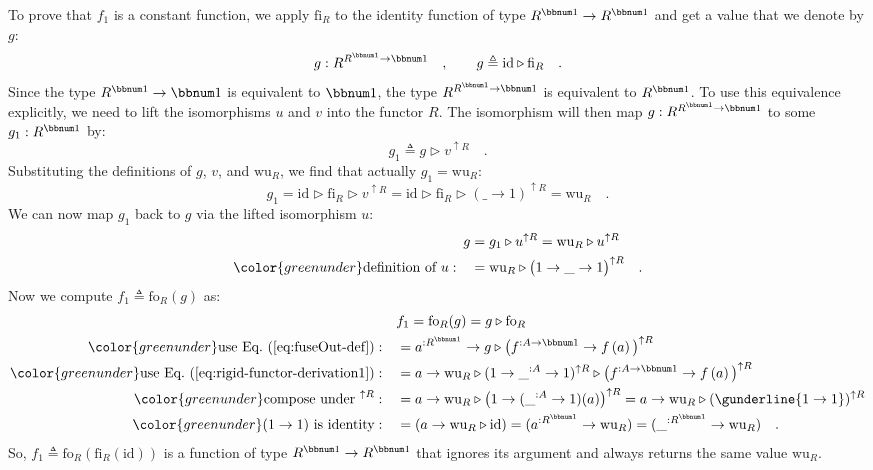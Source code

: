 To prove that $f_{1}$ is a constant function, we apply $\text{fi}_{R}$
to the identity function of type $R^{\bbnum 1}\rightarrow R^{\bbnum 1}$
and get a value that we denote by $g$:
\[
g:R^{R^{\bbnum 1}\rightarrow\bbnum 1}\quad,\quad\quad g\triangleq\text{id}\triangleright\text{fi}_{R}\quad.
\]
Since the type $R^{\bbnum 1}\rightarrow\bbnum 1$ is equivalent to
$\bbnum 1$, the type $R^{R^{\bbnum 1}\rightarrow\bbnum 1}$ is equivalent
to $R^{\bbnum 1}$. To use this equivalence explicitly, we need to
lift the isomorphisms $u$ and $v$ into the functor $R$. The isomorphism
will then map $g:R^{R^{\bbnum 1}\rightarrow\bbnum 1}$ to some $g_{1}:R^{\bbnum 1}$
by:
\[
g_{1}\triangleq g\triangleright v^{\uparrow R}\quad.
\]
Substituting the definitions of $g$, $v$, and $\text{wu}_{R}$,
we find that actually $g_{1}=\text{wu}_{R}$:
\[
g_{1}=\text{id}\triangleright\text{fi}_{R}\triangleright v^{\uparrow R}=\text{id}\triangleright\text{fi}_{R}\triangleright(\_\rightarrow1)^{\uparrow R}=\text{wu}_{R}\quad.
\]
We can now map $g_{1}$ back to $g$ via the lifted isomorphism $u$:
\begin{align}
g & =g_{1}\triangleright u^{\uparrow R}=\text{wu}_{R}\triangleright u^{\uparrow R}\nonumber \\
{\color{greenunder}\text{definition of }u:}\quad & =\text{wu}_{R}\triangleright\big(1\rightarrow\_\rightarrow1\big)^{\uparrow R}\quad.\label{eq:rigid-functor-derivation1}
\end{align}
Now we compute $f_{1}\triangleq\text{fo}_{R}(g)$ as:
\begin{align*}
 & f_{1}=\text{fo}_{R}(g)=g\triangleright\text{fo}_{R}\\
{\color{greenunder}\text{use Eq.~(\ref{eq:fuseOut-def})}:}\quad & =a^{:R^{\bbnum 1}}\rightarrow g\triangleright\big(f^{:A\rightarrow\bbnum 1}\rightarrow f\left(a\right)\big)^{\uparrow R}\\
{\color{greenunder}\text{use Eq.~(\ref{eq:rigid-functor-derivation1})}:}\quad & =a\rightarrow\text{wu}_{R}\triangleright(1\rightarrow\_^{:A}\rightarrow1)^{\uparrow R}\triangleright\big(f^{:A\rightarrow\bbnum 1}\rightarrow f\left(a\right)\big)^{\uparrow R}\\
{\color{greenunder}\text{compose under }^{\uparrow R}:}\quad & =a\rightarrow\text{wu}_{R}\triangleright\big(1\rightarrow(\_^{:A}\rightarrow1)(a)\big)^{\uparrow R}=a\rightarrow\text{wu}_{R}\triangleright(\gunderline{1\rightarrow1})^{\uparrow R}\\
{\color{greenunder}(1\rightarrow1)\text{ is identity}:}\quad & =(a\rightarrow\text{wu}_{R}\triangleright\text{id})=(a^{:R^{\bbnum 1}}\rightarrow\text{wu}_{R})=(\_^{:R^{\bbnum 1}}\rightarrow\text{wu}_{R})\quad.
\end{align*}
So, $f_{1}\triangleq\text{fo}_{R}(\text{fi}_{R}(\text{id}))$ is a
function of type $R^{\bbnum 1}\rightarrow R^{\bbnum 1}$ that ignores
its argument and always returns the same value $\text{wu}_{R}$.

